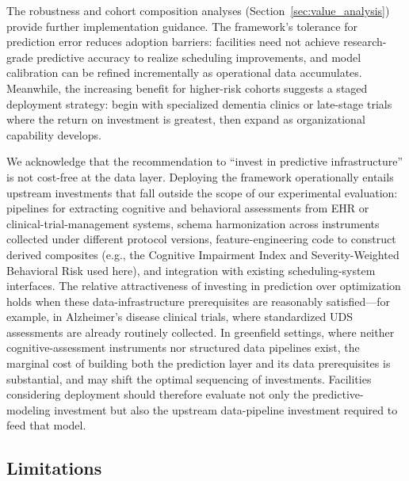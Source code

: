 \documentclass[11pt,a4paper]{article}
\begin{document}
The robustness and cohort composition analyses (Section~\ref{sec:value_analysis}) provide further implementation guidance. The framework's tolerance for prediction error reduces adoption barriers: facilities need not achieve research-grade predictive accuracy to realize scheduling improvements, and model calibration can be refined incrementally as operational data accumulates. Meanwhile, the increasing benefit for higher-risk cohorts suggests a staged deployment strategy: begin with specialized dementia clinics or late-stage trials where the return on investment is greatest, then expand as organizational capability develops.

We acknowledge that the recommendation to ``invest in predictive infrastructure'' is not cost-free at the data layer. Deploying the framework operationally entails upstream investments that fall outside the scope of our experimental evaluation: pipelines for extracting cognitive and behavioral assessments from EHR or clinical-trial-management systems, schema harmonization across instruments collected under different protocol versions, feature-engineering code to construct derived composites (e.g., the Cognitive Impairment Index and Severity-Weighted Behavioral Risk used here), and integration with existing scheduling-system interfaces. The relative attractiveness of investing in prediction over optimization holds when these data-infrastructure prerequisites are reasonably satisfied---for example, in Alzheimer's disease clinical trials, where standardized UDS assessments are already routinely collected. In greenfield settings, where neither cognitive-assessment instruments nor structured data pipelines exist, the marginal cost of building both the prediction layer and its data prerequisites is substantial, and may shift the optimal sequencing of investments. Facilities considering deployment should therefore evaluate not only the predictive-modeling investment but also the upstream data-pipeline investment required to feed that model.

\subsection{Limitations}
\label{sec:limitations}
\end{document}
